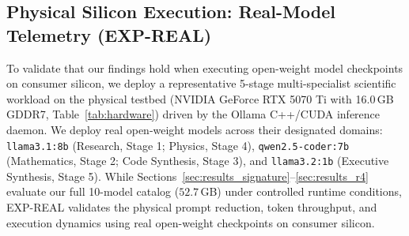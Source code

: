 \subsection{Physical Silicon Execution: Real-Model Telemetry (EXP-REAL)}
\label{sec:results_real}

To validate that our findings hold when executing open-weight model checkpoints on consumer silicon, we deploy a representative 5-stage multi-specialist scientific workload on the physical testbed (NVIDIA GeForce RTX 5070 Ti with 16.0\,GB GDDR7, Table~\ref{tab:hardware}) driven by the Ollama C++/CUDA inference daemon. We deploy real open-weight models across their designated domains: \texttt{llama3.1:8b} (Research, Stage 1; Physics, Stage 4), \texttt{qwen2.5-coder:7b} (Mathematics, Stage 2; Code Synthesis, Stage 3), and \texttt{llama3.2:1b} (Executive Synthesis, Stage 5). While Sections~\ref{sec:results_signature}--\ref{sec:results_r4} evaluate our full 10-model catalog ($52.7$\,GB) under controlled runtime conditions, EXP-REAL validates the physical prompt reduction, token throughput, and execution dynamics using real open-weight checkpoints on consumer silicon.

\begin{table}[t]
\small
\centering
\caption{Empirical Physical Hardware Telemetry: Raw Text Transcript Concatenation vs.\ ModelVM Typed CSP on NVIDIA RTX 5070 Ti (Ollama Engine, Real Physical Hardware). Throughput variations reflect model parameter scale (1B vs.\ 7B/8B).}
\label{tab:real_ollama_telemetry}
\end{table}

